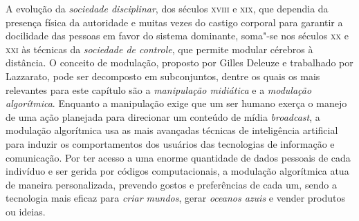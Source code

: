 A evolução da \emph{sociedade disciplinar}, dos séculos \textsc{xviii} e \textsc{xix}, que
dependia da presença física da autoridade e muitas vezes do castigo
corporal para garantir a docilidade das pessoas em favor do sistema
dominante, soma"-se nos séculos \textsc{xx} e \textsc{xxi} às técnicas da \emph{sociedade
de controle}, que permite modular cérebros à distância. O conceito de
modulação, proposto por Gilles Deleuze e trabalhado por Lazzarato, pode
ser decomposto em subconjuntos, dentre os quais os mais relevantes para
este capítulo são a \emph{manipulação midiática} e a \emph{modulação
algorítmica}. Enquanto a manipulação exige que um ser humano exerça o
manejo de uma ação planejada para direcionar um conteúdo de mídia
\emph{broadcast}, a modulação algorítmica usa as mais avançadas técnicas
de inteligência artificial para induzir os comportamentos dos usuários
das tecnologias de informação e comunicação. Por ter acesso a uma enorme
quantidade de dados pessoais de cada indivíduo e ser gerida por códigos
computacionais, a modulação algorítmica atua de maneira personalizada,
prevendo gostos e preferências de cada um, sendo a tecnologia mais
eficaz para \emph{criar mundos}, gerar \emph{oceanos azuis} e vender
produtos ou ideias.


